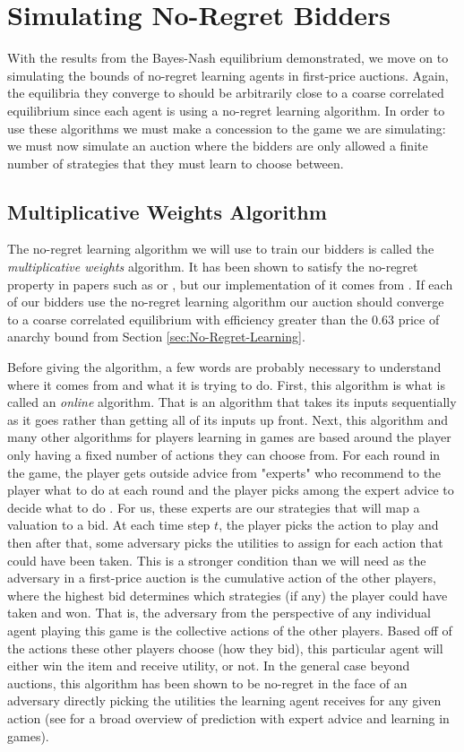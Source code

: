 \documentclass[12pt,twoside]{reedthesis}
\begin{document}
\section{Simulating No-Regret Bidders}
With the results from the Bayes-Nash equilibrium demonstrated, we move on to simulating the bounds of no-regret learning agents in first-price auctions. Again, the equilibria they converge to should be arbitrarily close to a coarse correlated equilibrium since each agent is using a no-regret learning algorithm. In order to use these algorithms we must make a concession to the game we are simulating: we must now simulate an auction where the bidders are only allowed a finite number of strategies that they must learn to choose between.

\subsection{Multiplicative Weights Algorithm}
The no-regret learning algorithm we will use to train our bidders is called the {\em multiplicative weights} algorithm. It has been shown to satisfy the no-regret property in papers such as \citet{Littlestone1994} or \citet{Freund1999}, but our implementation of it comes from \cite{Roughgarden2016}. If each of our bidders use the no-regret learning algorithm our auction should converge to a coarse correlated equilibrium with efficiency greater than the $0.63$ price of anarchy bound from Section \ref{sec:No-Regret-Learning}. 

Before giving the algorithm, a few words are probably necessary to understand where it comes from and what it is trying to do. First, this algorithm is what is called an {\em online} algorithm. That is an algorithm that takes its inputs sequentially as it goes rather than getting all of its inputs up front. Next, this algorithm and many other algorithms for players learning in games are based around the player only having a fixed number of actions they can choose from. For each round in the game, the player gets outside advice from "experts" who recommend to the player what to do at each round and the player picks among the expert advice to decide what to do \citep{Roughgarden2016}. For us, these experts are our strategies that will map a valuation to a bid. At each time step $t$, the player picks the action to play and then after that, some adversary picks the utilities to assign for each action that could have been taken. This is a stronger condition than we will need as the adversary in a first-price auction is the cumulative action of the other players, where the highest bid determines which strategies (if any) the player could have taken and won. That is, the adversary from the perspective of any individual agent playing this game is the collective actions of the other players. Based off of the actions these other players choose (how they bid), this particular agent will either win the  item and receive utility, or not. In the general case beyond auctions, this algorithm has been shown to be no-regret in the face of an adversary directly picking the utilities the learning agent receives for any given action (see \cite{Lugosi2006} for a broad overview of prediction with expert advice and learning in games).\\
\end{document}

